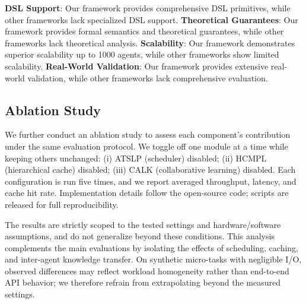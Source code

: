 \documentclass[conference]{IEEEtran}
\begin{document}
\textbf{DSL Support}: Our framework provides comprehensive DSL primitives, while other frameworks lack specialized DSL support.
\textbf{Theoretical Guarantees}: Our framework provides formal semantics and theoretical guarantees, while other frameworks lack theoretical analysis.
\textbf{Scalability}: Our framework demonstrates superior scalability up to 1000 agents, while other frameworks show limited scalability.
\textbf{Real-World Validation}: Our framework provides extensive real-world validation, while other frameworks lack comprehensive evaluation.

\begin{table}[htbp]
\caption{Multi-Agent Framework Comparison}
\label{tab:framework_compare}
\centering
{}
\end{table}

\subsection{Ablation Study}

We further conduct an ablation study to assess each component's contribution under the same evaluation protocol. We toggle off one module at a time while keeping others unchanged: (i) ATSLP (scheduler) disabled; (ii) HCMPL (hierarchical cache) disabled; (iii) CALK (collaborative learning) disabled. Each configuration is run five times, and we report averaged throughput, latency, and cache hit rate. Implementation details follow the open-source code; scripts are released for full reproducibility.


The results are strictly scoped to the tested settings and hardware/software assumptions, and do not generalize beyond these conditions. This analysis complements the main evaluations by isolating the effects of scheduling, caching, and inter-agent knowledge transfer. On synthetic micro-tasks with negligible I/O, observed differences may reflect workload homogeneity rather than end-to-end API behavior; we therefore refrain from extrapolating beyond the measured settings.
\end{document}
